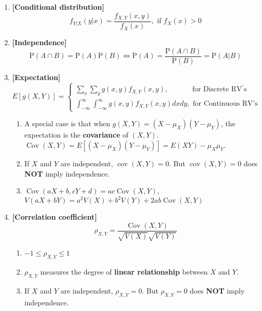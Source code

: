 \documentclass[a4paper]{article}
\begin{document}
\begin{enumerate}
\item
\textbf{[Conditional distribution]}
\begin{equation}
    f_{Y|X}(y | x)=\frac{f_{X, Y}(x, y)}{f_{X}(x)}, \text { if } f_{X}(x)>0
\end{equation}

\item
\textbf{[Independence]}
\begin{equation}
    \mathrm{P}(A \cap B)=\mathrm{P}(A) \mathrm{P}(B) \Longleftrightarrow \mathrm{P}(A)=\frac{\mathrm{P}(A \cap B)}{\mathrm{P}(B)}=\mathrm{P}(A | B)
\end{equation}

\item
\textbf{[Expectation]}
\begin{equation}
    E[g(X, Y)]=\left\{\begin{array}{l}{\sum_{x} \sum_{y} g(x, y) f_{X, Y}(x, y), \quad \quad \quad \text { for Discrete } \mathrm{RV}^{\prime} \mathrm{s}} \\ {\int_{-\infty}^{\infty} \int_{-\infty}^{\infty} g(x, y) f_{X, Y}(x, y) d x d y, \text { for Continuous RV's }}\end{array}\right.
\end{equation}

\begin{enumerate}
    \item 
    A special case is that when $g(X, Y)=\left(X-\mu_{X}\right)\left(Y-\mu_{Y}\right)$, the expectation is the \textbf{covariance} of $(X, Y)$.
    $\operatorname{Cov}(X, Y)=E\left[\left(X-\mu_{X}\right)\left(Y-\mu_{Y}\right)\right] = E(X Y)-\mu_{X} \mu_{Y}$.
    
    \item
    If $X$ and $Y$ are independent, $\operatorname{cov}(X, Y)=0$. But $\operatorname{cov}(X, Y)=0$ does \textbf{NOT} imply independence.
    
    \item
    $\operatorname{Cov}(a X+b, c Y+d)=a c \operatorname{Cov}(X, Y)$, $V(a X+b Y)=a^{2} V(X)+b^{2} V(Y)+2 a b \operatorname{Cov}(X, Y)$
\end{enumerate}

\item
\textbf{[Correlation coefficient]}
\begin{equation}
    \rho_{X, Y}=\frac{\operatorname{Cov}(X, Y)}{\sqrt{V(X)} \sqrt{V(Y)}}
\end{equation}

\begin{enumerate}
    \item 
    $-1 \leq \rho_{X, Y} \leq 1$
    
    \item
    $\rho_{X, Y}$ measures the degree of \textbf{linear relationship} between $X$ and $Y$.
    
    \item
    If $X$ and $Y$ are independent, $\rho_{X, Y} = 0$. But $\rho_{X, Y} = 0$ does \textbf{NOT} imply independence.
\end{enumerate}

 
\end{enumerate}
\end{document}
